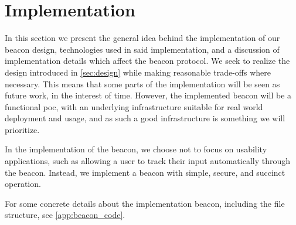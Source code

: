 \section{Implementation}%
\label{sec:implementation}

In this section we present the general idea behind the implementation of our beacon design, technologies used in said implementation, and a discussion of implementation details which affect the beacon protocol.
We seek to realize the design introduced in \cref{sec:design} while making reasonable trade-offs where necessary.
This means that some parts of the implementation will be seen as future work, in the interest of time.
However, the implemented beacon will be a functional \gls{poc}, with an underlying infrastructure suitable for real world deployment and usage, and as such a good infrastructure is something we will prioritize.

In the implementation of the beacon, we choose not to focus on usability applications, such as allowing a user to track their input automatically through the beacon.
Instead, we implement a beacon with simple, secure, and succinct operation.

For some concrete details about the implementation beacon, including the file structure, see \vref{app:beacon_code}.
